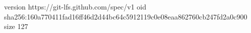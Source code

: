version https://git-lfs.github.com/spec/v1
oid sha256:160a770411fad16ff46d2d44bc64c5912119c0e08eaa862760cb247fd2a0c900
size 127
